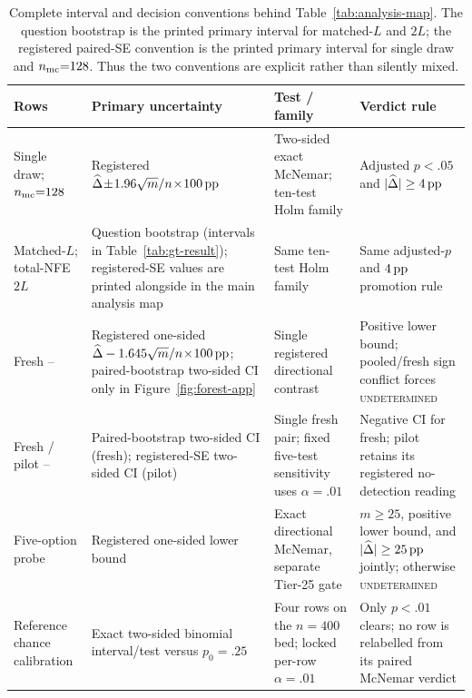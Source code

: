 \begin{table}[H]
\centering
\footnotesize
\setlength{\tabcolsep}{3pt}
\caption{Complete interval and decision conventions behind
Table~\ref{tab:analysis-map}.  The question bootstrap is the printed primary
interval for matched-$L$ and $2L$; the registered paired-SE convention is the
printed primary interval for single draw and $n_{\rm mc}{=}128$.  Thus the two
conventions are explicit rather than silently mixed.}
\label{tab:analysis-map-detail}
\begin{tabularx}{\textwidth}{@{}P{0.19\textwidth}P{0.28\textwidth}YY@{}}
\toprule
Rows & Primary uncertainty & Test / family & Verdict rule \\
\midrule
Single draw; $n_{\rm mc}{=}128$ & Registered
$\widehat\Delta\!\pm\!1.96\sqrt{m}/n\!\times\!100\,\mathrm{pp}$ & Two-sided exact
McNemar; ten-test Holm family & Adjusted $p<.05$ and $|\widehat\Delta|\ge4\,\mathrm{pp}$ \\
Matched-$L$; total-NFE $2L$ & Question bootstrap (intervals in
Table~\ref{tab:gt-result}); registered-SE values are printed alongside in the
main analysis map & Same ten-test Holm family & Same adjusted-$p$ and $4\,\mathrm{pp}$
promotion rule \\
Fresh \sconf{}--\rinj{} & Registered one-sided
$\widehat\Delta-1.645\sqrt{m}/n\!\times\!100\,\mathrm{pp}$; paired-bootstrap two-sided
CI only in Figure~\ref{fig:forest-app} & Single registered directional contrast &
Positive lower bound; pooled/fresh sign conflict forces \textsc{undetermined} \\
Fresh / pilot \sconf{}--\finj{} & Paired-bootstrap two-sided CI (fresh);
registered-SE two-sided CI (pilot) & Single fresh pair; fixed five-test
sensitivity uses $\alpha=.01$ & Negative CI for fresh; pilot retains its
registered no-detection reading \\
Five-option probe & Registered one-sided lower bound & Exact directional
McNemar, separate Tier-25 gate & $m\ge25$, positive lower bound, and
$|\widehat\Delta|\ge25\,\mathrm{pp}$ jointly; otherwise \textsc{undetermined} \\
Reference chance calibration & Exact two-sided binomial interval/test versus
$p_0=.25$ & Four rows on the $n=400$ bed; locked per-row $\alpha=.01$ & Only
$p<.01$ clears; no row is relabelled from its paired McNemar verdict \\
\bottomrule
\end{tabularx}
\end{table}

